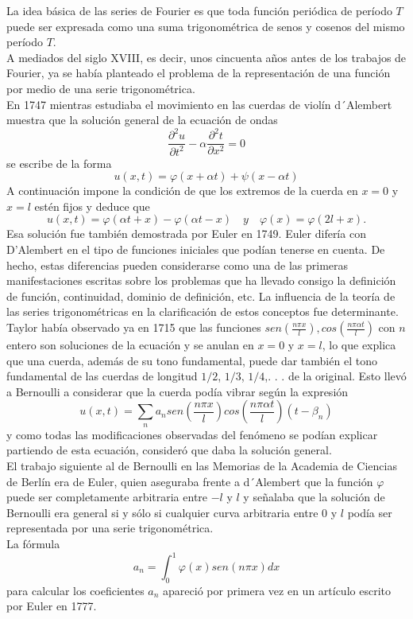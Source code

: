 \documentclass[a4paper,12pt]{article}
\begin{document}
La idea básica de las series de Fourier es que toda función periódica de período $T$ puede ser expresada como una suma trigonométrica de senos y cosenos del mismo período $T$.\\
\indent A mediados del siglo XVIII, es decir, unos cincuenta años antes de los trabajos de Fourier, ya se había planteado el problema de la representación de una función por medio de una serie trigonométrica.\\
\indent En 1747 mientras estudiaba el movimiento en las cuerdas de violín d´Alembert muestra que la solución general de la ecuación de ondas
\[ \frac{\partial ^2u}{\partial t^2}-\alpha\frac{\partial^2t}{\partial x^2} = 0 \]
se escribe de la forma
\[ u(x,t) = \varphi(x + \alpha t) + \psi(x - \alpha t)  \]
A continuación impone la condición de que los extremos de la cuerda en $x = 0$ y $x = l$ estén fijos y deduce que
\[ u(x, t) = \varphi(\alpha t + x) - \varphi(\alpha t - x) \quad y \quad \varphi(x) = \varphi(2l + x). \]
Esa solución fue también demostrada por Euler en 1749. Euler difería con D’Alembert en el tipo de funciones iniciales que podían tenerse en cuenta. De hecho, estas diferencias pueden considerarse como una de las primeras
manifestaciones escritas sobre los problemas que ha llevado consigo la definición de función, continuidad, dominio de definición, etc. La influencia de la teoría de las series trigonométricas en la clarificación de estos conceptos fue determinante.\\
Taylor había observado ya en 1715 que las funciones $sen\left( \frac{n\pi x}{l}\right), cos\left(\frac{n\pi \alpha t}{l}\right)$ con $n$ entero son soluciones de la ecuación y se anulan en $x = 0$ y $x = l$, lo que explica que una cuerda, además de su tono fundamental, puede dar también el tono fundamental de las cuerdas de longitud $1/2$, $1/3$, $1/4$,. . . de la original. Esto llevó a Bernoulli a considerar que la cuerda podía vibrar según la expresión
\[ u(x,t) = \sum _n a_n sen\left( \frac{n\pi x}{l}\right)cos\left(\frac{n\pi \alpha t}{l}\right)(t-\beta_n)\]
y como todas las modificaciones observadas del fenómeno se podían explicar partiendo de esta ecuación, consideró que daba la solución general.\\
\indent El trabajo siguiente al de Bernoulli en las Memorias de la Academia de Ciencias de Berlín era de Euler, quien aseguraba frente a d´Alembert que la función $\varphi$ puede ser completamente arbitraria entre $-l$ y $l$ y señalaba que la solución de Bernoulli era general si y sólo si cualquier curva arbitraria entre $0$ y $l$ podía ser representada por una serie trigonométrica.\\
La fórmula
\[ a_n = \int_0^1 \varphi(x)sen\left(n\pi x\right)dx \]
para calcular los coeficientes $a_n$ apareció por primera vez en un artículo escrito por Euler en 1777.
\end{document}
